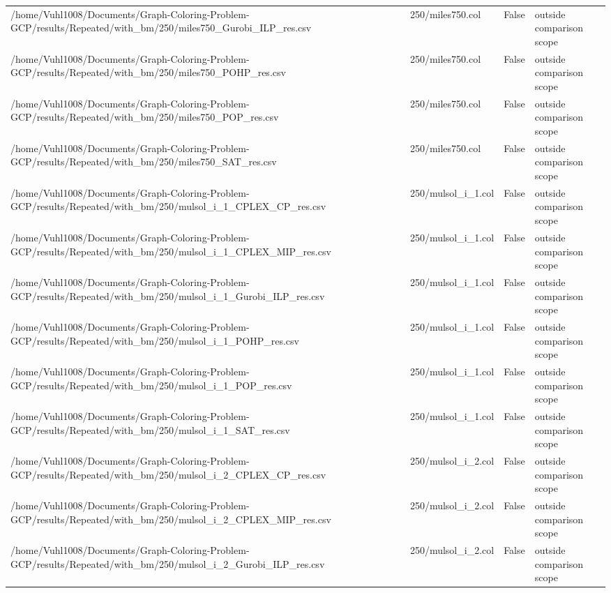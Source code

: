 \begin{table}[htbp]
\begin{tabular}{llll}
/home/Vuhl1008/Documents/Graph-Coloring-Problem-GCP/results/Repeated/with\_bm/250/miles750\_Gurobi\_ILP\_res.csv & 250/miles750.col & False & outside comparison scope \\
/home/Vuhl1008/Documents/Graph-Coloring-Problem-GCP/results/Repeated/with\_bm/250/miles750\_POHP\_res.csv & 250/miles750.col & False & outside comparison scope \\
/home/Vuhl1008/Documents/Graph-Coloring-Problem-GCP/results/Repeated/with\_bm/250/miles750\_POP\_res.csv & 250/miles750.col & False & outside comparison scope \\
/home/Vuhl1008/Documents/Graph-Coloring-Problem-GCP/results/Repeated/with\_bm/250/miles750\_SAT\_res.csv & 250/miles750.col & False & outside comparison scope \\
/home/Vuhl1008/Documents/Graph-Coloring-Problem-GCP/results/Repeated/with\_bm/250/mulsol\_i\_1\_CPLEX\_CP\_res.csv & 250/mulsol\_i\_1.col & False & outside comparison scope \\
/home/Vuhl1008/Documents/Graph-Coloring-Problem-GCP/results/Repeated/with\_bm/250/mulsol\_i\_1\_CPLEX\_MIP\_res.csv & 250/mulsol\_i\_1.col & False & outside comparison scope \\
/home/Vuhl1008/Documents/Graph-Coloring-Problem-GCP/results/Repeated/with\_bm/250/mulsol\_i\_1\_Gurobi\_ILP\_res.csv & 250/mulsol\_i\_1.col & False & outside comparison scope \\
/home/Vuhl1008/Documents/Graph-Coloring-Problem-GCP/results/Repeated/with\_bm/250/mulsol\_i\_1\_POHP\_res.csv & 250/mulsol\_i\_1.col & False & outside comparison scope \\
/home/Vuhl1008/Documents/Graph-Coloring-Problem-GCP/results/Repeated/with\_bm/250/mulsol\_i\_1\_POP\_res.csv & 250/mulsol\_i\_1.col & False & outside comparison scope \\
/home/Vuhl1008/Documents/Graph-Coloring-Problem-GCP/results/Repeated/with\_bm/250/mulsol\_i\_1\_SAT\_res.csv & 250/mulsol\_i\_1.col & False & outside comparison scope \\
/home/Vuhl1008/Documents/Graph-Coloring-Problem-GCP/results/Repeated/with\_bm/250/mulsol\_i\_2\_CPLEX\_CP\_res.csv & 250/mulsol\_i\_2.col & False & outside comparison scope \\
/home/Vuhl1008/Documents/Graph-Coloring-Problem-GCP/results/Repeated/with\_bm/250/mulsol\_i\_2\_CPLEX\_MIP\_res.csv & 250/mulsol\_i\_2.col & False & outside comparison scope \\
/home/Vuhl1008/Documents/Graph-Coloring-Problem-GCP/results/Repeated/with\_bm/250/mulsol\_i\_2\_Gurobi\_ILP\_res.csv & 250/mulsol\_i\_2.col & False & outside comparison scope \\

\end{tabular}
\end{table}
